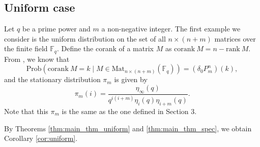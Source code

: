 \documentclass[a4]{amsart}
\newcommand{\Prob}{{\mathrm{Prob}}}
\newcommand{\Mat}{{\mathrm{Mat}}}
\newcommand{\rank}{\mathrm{rank~}}
\newcommand{\corank}{\mathrm{corank~}}
\theoremstyle{remark} \newtheorem{remark}[theorem]{Remark}
\begin{document}
\subsection{Uniform case}
Let $q$ be a prime power and $m$ a non-negative integer. 
The first example we consider is the uniform distribution on the set of all $n \times (n + m)$ matrices over the finite field $\mathbb{F}_q$. 
Define the corank of a matrix $M$ as $\corank M = n - \rank M$. From \cite[Section 1]{gerthiii1986Limit}, we know that
\[
\Prob\left(\corank M = k \mid M \in \Mat_{n \times (n + m)}(\mathbb{F}_q)\right) = (\delta_0 P_m^n)(k),
\]
and the stationary distribution $\pi_m$ is given by
\[
\pi_m(i) = \frac{\eta_\infty(q)}{q^{i(i + m)} \eta_i(q) \eta_{i + m}(q)}.
\]
Note that this $\pi_m$ is the same as the one defined in Section 3.

By Theorems \ref{thm:main_thm_uniform} and \ref{thm:main_thm_spec}, we obtain Corollary \ref{cor:uniform}.
\end{document}
